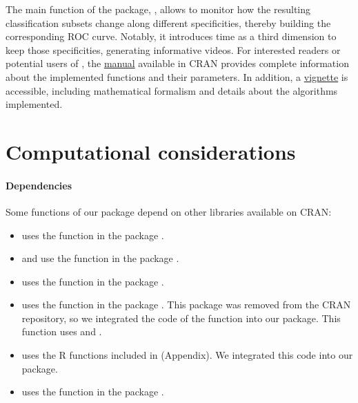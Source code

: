 \noindent The main function of the package, , allows to monitor how the resulting classification subsets change along different specificities, thereby building the corresponding ROC curve. Notably, it introduces time as a third dimension to keep those specificities, generating informative videos. For interested readers or potential users of , the \href{https://cran.r-project.org/web/packages/movieROC/movieROC.pdf}{manual} available in CRAN provides complete information about the implemented functions and their parameters. In addition, a \href{https://cran.r-project.org/web/packages/movieROC/vignettes/movieROC_vignette.pdf}{vignette} is accessible, including mathematical formalism and details about the algorithms implemented.



\section*{Computational considerations} \label{sec:complim}

\paragraph{Dependencies} Some functions of our package depend on other libraries available on CRAN:
\begin{itemize}
\item {} uses the  function in the  package \citep{e1071CRAN2023}.
\item  {} and  use the  function in the  package \citep{rmsCRAN2023}.
\item {} uses the  function in the  package \citep{ksCRAN2023}.
\item {} uses the  function in the  package \citep{Meisner2021}. This package was removed from the CRAN repository, so we integrated the code of the  function into our package. This function uses  and .
\item {} uses the R functions included in \citet{Kang2016} (Appendix). We integrated this code into our package.
\item {} uses the  function in the  package \citep{animationCRAN2021}.
\end{itemize}


